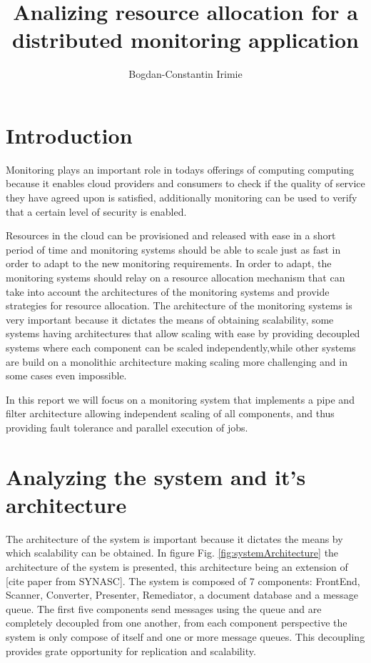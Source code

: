 \documentclass[fleqn,10pt]{./class/wlscirep}
\title{Analizing resource allocation for a distributed monitoring application}
\author[1,2,3,*]{Bogdan-Constantin Irimie}
\affil[1]{Institute e-Austria Timisoara, Romania}
\affil[2]{Department of Computer Science, West University of Timisoara, Romania}
\affil[3]{Department of Computing, Imperial College London, United Kingdon}
\affil[*]{bogdan.irimie90@e-uvt.ro}
\begin{document}
\flushbottom
\maketitle
\thispagestyle{empty}

\section*{Introduction}

Monitoring plays an important role in todays offerings of computing computing because it enables cloud providers and consumers to check if the quality of service they have agreed upon is satisfied, additionally monitoring can be used to verify that a certain level of security is enabled. 

Resources in the cloud can be provisioned and released with ease in a short period of time and monitoring systems should be able to scale just as fast in order to adapt to the new monitoring requirements. In order to adapt, the monitoring systems
should relay on a resource allocation mechanism that can take into account the architectures of the monitoring systems and provide strategies for resource allocation. The architecture of the monitoring systems is very important because it dictates the means of obtaining scalability, some systems having architectures that allow scaling with ease by providing decoupled systems where each component can be scaled independently,while other systems are build on a monolithic architecture making scaling more challenging and in some cases even impossible.

In this report we will focus on a monitoring system that implements a pipe and filter architecture allowing independent scaling of all components, and thus providing fault tolerance and parallel execution of jobs. 

\section{Analyzing the system and it's architecture}
The architecture of the system is important because it dictates the means by which scalability can be obtained. In figure Fig. \ref{fig:systemArchitecture} the architecture of the system is presented, this architecture being an extension of [cite paper from SYNASC]. The system is composed of 7 components: FrontEnd, Scanner, Converter, Presenter, Remediator, a document database and a message queue. The first five components send messages using the queue and are completely decoupled from one another, from each component perspective the system is only compose of itself and one or more message queues. This decoupling provides grate opportunity for replication and scalability.
\end{document}
